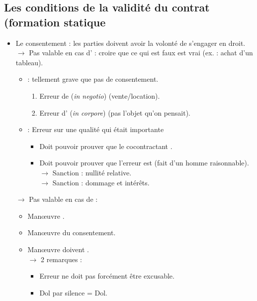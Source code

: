 \subsection{Les conditions de la validité du contrat (formation statique}

\begin{itemize}
	\item Le consentement : les parties doivent avoir la volonté de s'engager en droit.\\
	$\rightarrow$ Pas valable en cas d' : croire que ce qui est faux est vrai (ex. : achat d'un tableau).
	\begin{itemize}
		\item {} : tellement grave que pas de consentement.
		\begin{enumerate}
			\item Erreur de  (\textit{in negotio}) (vente/location).
			\item Erreur d' (\textit{in corpore}) (pas l'objet qu'on pensait).
		\end{enumerate}
		\item {} : Erreur sur une qualité qui était importante
		\begin{itemize}
			\item Doit pouvoir prouver que le cocontractant .
			\item Doit pouvoir prouver que l'erreur est  (fait d'un homme raisonnable).\\
			$\rightarrow$ Sanction : nullité relative.\\
			$\rightarrow$ Sanction : dommage et intérêts.
		\end{itemize}
	\end{itemize}
	$\rightarrow$ Pas valable en cas de  :
	\begin{itemize}
		\item Manœuvre .
		\item Manœuvre  du consentement.
		\item Manœuvre doivent .\\
		$\rightarrow$ 2 remarques :
		\begin{itemize}
			\item Erreur ne doit pas forcément être excusable.
			\item Dol par silence = Dol.
		\end{itemize}

\end{itemize}
\end{itemize}
